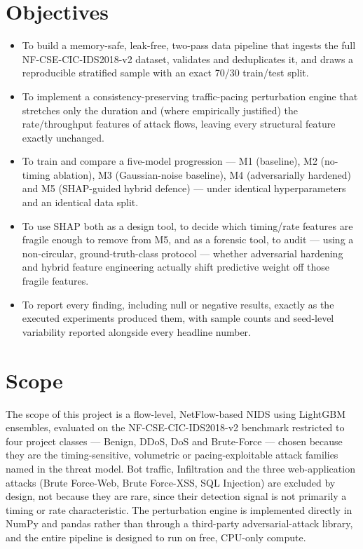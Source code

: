 \documentclass[12pt,a4paper]{report}
\begin{document}
\section{Objectives}
\begin{itemize}\setlength\itemsep{2pt}\item To build a memory-safe, leak-free, two-pass data pipeline that ingests the full NF-CSE-CIC-IDS2018-v2 dataset, validates and deduplicates it, and draws a reproducible stratified sample with an exact 70/30 train/test split.\end{itemize}
\begin{itemize}\setlength\itemsep{2pt}\item To implement a consistency-preserving traffic-pacing perturbation engine that stretches only the duration and (where empirically justified) the rate/throughput features of attack flows, leaving every structural feature exactly unchanged.\end{itemize}
\begin{itemize}\setlength\itemsep{2pt}\item To train and compare a five-model progression --- M1 (baseline), M2 (no-timing ablation), M3 (Gaussian-noise baseline), M4 (adversarially hardened) and M5 (SHAP-guided hybrid defence) --- under identical hyperparameters and an identical data split.\end{itemize}
\begin{itemize}\setlength\itemsep{2pt}\item To use SHAP both as a design tool, to decide which timing/rate features are fragile enough to remove from M5, and as a forensic tool, to audit --- using a non-circular, ground-truth-class protocol --- whether adversarial hardening and hybrid feature engineering actually shift predictive weight off those fragile features.\end{itemize}
\begin{itemize}\setlength\itemsep{2pt}\item To report every finding, including null or negative results, exactly as the executed experiments produced them, with sample counts and seed-level variability reported alongside every headline number.\end{itemize}
\section{Scope}
The scope of this project is a flow-level, NetFlow-based NIDS using LightGBM ensembles, evaluated on the NF-CSE-CIC-IDS2018-v2 benchmark restricted to four project classes --- Benign, DDoS, DoS and Brute-Force --- chosen because they are the timing-sensitive, volumetric or pacing-exploitable attack families named in the threat model. Bot traffic, Infiltration and the three web-application attacks (Brute Force-Web, Brute Force-XSS, SQL Injection) are excluded by design, not because they are rare, since their detection signal is not primarily a timing or rate characteristic. The perturbation engine is implemented directly in NumPy and pandas rather than through a third-party adversarial-attack library, and the entire pipeline is designed to run on free, CPU-only compute.
\end{document}
